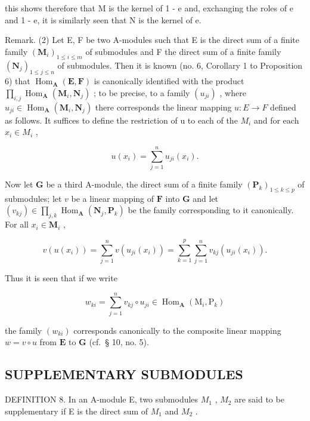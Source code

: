 this shows therefore that M is the kernel of 1 - e and, exchanging the roles of e and 1 - e, it is similarly seen that N is the kernel of e.

Remark. (2) Let E, F be two A-modules such that E is the direct sum of a finite family \((\mathbf{M}_{i})_{1\leqslant i\leqslant m}\) of submodules and F the direct sum of a finite family \((\mathbf{N}_{j})_{1\leqslant j\leqslant n}\) of submodules. Then it is known (no. 6, Corollary 1 to Proposition 6) that \(\operatorname{Hom}_{\mathbf{A}}(\mathbf{E},\mathbf{F})\) is canonically identified with the product \(\prod_{i,j}\operatorname{Hom}_{\mathbf{A}}(\mathbf{M}_{i},\mathbf{N}_{j})\) ; to be precise, to a family \((u_{ji})\) , where \(u_{ji}\in\operatorname{Hom}_{\mathbf{A}}(\mathbf{M}_{i},\mathbf{N}_{j})\) there corresponds the linear mapping \(u:E\to F\) defined as follows. It suffices to define the restriction of u to each of the \(M_{i}\) and for each \(x_{i}\in M_{i}\) ,

\[
u (x _ {i}) = \sum_ {j = 1} ^ {n} u _ {j i} (x _ {i}).
\]

Now let \(\mathbf{G}\) be a third A-module, the direct sum of a finite family \((\mathbf{P}_k)_{1 \leqslant k \leqslant p}\) of submodules; let \(v\) be a linear mapping of \(\mathbf{F}\) into \(\mathbf{G}\) and let \((v_{kj}) \in \prod_{j,k} \operatorname{Hom}_{\mathbf{A}}(\mathbf{N}_j, \mathbf{P}_k)\) be the family corresponding to it canonically. For all \(x_i \in \mathbf{M}_i\) ,

\[
v (u (x _ {i})) = \sum_ {j = 1} ^ {n} v (u _ {j i} (x _ {i})) = \sum_ {k = 1} ^ {p} \sum_ {j = 1} ^ {n} v _ {k j} (u _ {j i} (x _ {i})).
\]

Thus it is seen that if we write

\[
w _ {k i} = \sum_ {j = 1} ^ {n} v _ {k j} \circ u _ {j i} \in \operatorname{Hom} _ {\mathbf {A}} (\mathrm{M} _ {i}, \mathrm{P} _ {k})\tag{32}
\]

the family \((w_{ki})\) corresponds canonically to the composite linear mapping \(w = v \circ u\) from \(\mathbf{E}\) to \(\mathbf{G}\) (cf.~§ 10, no. 5).

\subsection{SUPPLEMENTARY SUBMODULES}

DEFINITION 8. In an A-module E, two submodules \(M_{1}\) , \(M_{2}\) are said to be supplementary if E is the direct sum of \(M_{1}\) and \(M_{2}\) .


